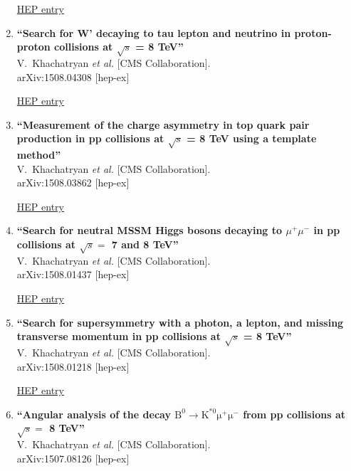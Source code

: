 \documentclass{article}
\begin{document}
\begin{enumerate}
\href{http://inspirehep.net/record/1390110}{HEP entry}



\item%
{\bf ``Search for W' decaying to tau lepton and neutrino in proton-proton collisions at $\sqrt{s}$ = 8 TeV''}
  \\{}V.~Khachatryan {\it et al.} [CMS Collaboration].
  \\{}arXiv:1508.04308 [hep-ex]
  
\href{http://inspirehep.net/record/1388363}{HEP entry}



\item%
{\bf ``Measurement of the charge asymmetry in top quark pair production in pp collisions at $\sqrt{s}$ = 8 TeV using a template method''}
  \\{}V.~Khachatryan {\it et al.} [CMS Collaboration].
  \\{}arXiv:1508.03862 [hep-ex]
  
\href{http://inspirehep.net/record/1388178}{HEP entry}


\item%
{\bf ``Search for neutral MSSM Higgs bosons decaying to $\mu^{+} \mu^{-}$ in pp collisions at $ \sqrt{s} =$ 7 and 8 TeV''}
  \\{}V.~Khachatryan {\it et al.} [CMS Collaboration].
  \\{}arXiv:1508.01437 [hep-ex]
  
\href{http://inspirehep.net/record/1386854}{HEP entry}



\item%
{\bf ``Search for supersymmetry with a photon, a lepton, and missing transverse momentum in pp collisions at $\sqrt{s}$ = 8 TeV''}
  \\{}V.~Khachatryan {\it et al.} [CMS Collaboration].
  \\{}arXiv:1508.01218 [hep-ex]
  
\href{http://inspirehep.net/record/1386851}{HEP entry}



\item%
{\bf ``Angular analysis of the decay $ \mathrm{ B^0 \to K^{*0} \mu^{+} \mu^{-}  }$ from pp collisions at $\sqrt{s}=  $ 8 TeV''}
  \\{}V.~Khachatryan {\it et al.} [CMS Collaboration].
  \\{}arXiv:1507.08126 [hep-ex]
  

\end{enumerate}
\end{document}
